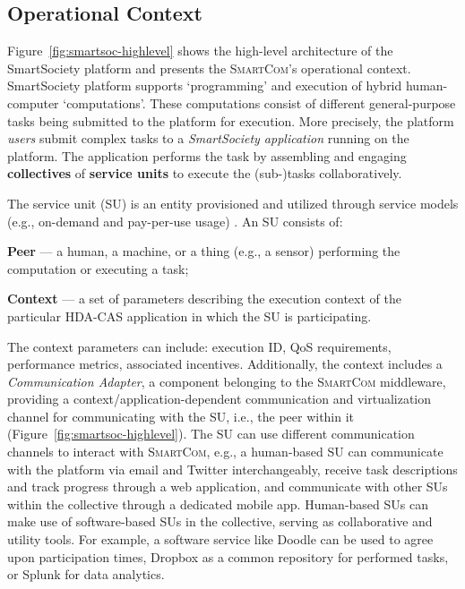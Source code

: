 \documentclass{llncs}
\newcommand{\mdl}{\textsc{SmartCom}}
\begin{document}
    \subsection{Operational Context}
    \label{sec:intro:context}

      Figure~\ref{fig:smartsoc-highlevel} shows the high-level architecture of the SmartSociety platform and presents the \mdl's operational context. SmartSociety platform supports `programming' and execution of hybrid human-computer `computations'. These computations consist of different general-purpose tasks being submitted to the platform for execution. More precisely, the platform \emph{users} submit complex tasks to a \emph{SmartSociety application} running on the platform. The application performs the task by assembling and engaging \textbf{collectives} of \textbf{service units} to execute the (sub-)tasks collaboratively.

      The service unit (SU) is an entity provisioned and utilized through service models (e.g., on-demand and pay-per-use usage) \cite{truongijcis}. An SU consists of:
        \begin{inparaenum}[\itshape i)]
          \item \textbf{Peer} --- a human, a machine, or a thing (e.g., a sensor) performing the computation or executing a task;
          \item \textbf{Context} --- a set of parameters describing the execution context of the particular HDA-CAS application in which the SU is participating. 
        \end{inparaenum}
      The context parameters can include: execution ID, QoS requirements, performance metrics, associated incentives. Additionally, the context includes a \emph{Communication Adapter}, a component belonging to the \mdl{} middleware, providing a context/application-dependent communication and virtualization channel for communicating with the SU, i.e., the peer within it (Figure~\ref{fig:smartsoc-highlevel}).
      The SU can use different communication channels to interact with \mdl{}, e.g., a human-based SU can communicate with the platform via email and Twitter interchangeably, receive task descriptions and track progress through a web application, and communicate with other SUs within the collective through a dedicated mobile app. Human-based SUs can make use of software-based SUs in the collective, serving as collaborative and utility tools. For example, a software service like Doodle can be used to agree upon participation times, Dropbox as a common repository for performed tasks, or Splunk for data analytics.
\end{document}
